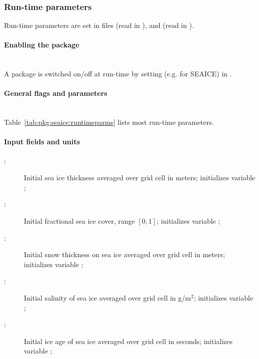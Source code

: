 
\subsubsection{Run-time parameters
\label{sec:pkg:seaice:runtime}}

Run-time parameters are set in files 
 (read in ),
and  (read in ).

\paragraph{Enabling the package}
~ \\
%
A package is switched on/off at run-time by setting
(e.g. for SEAICE)  in .

\paragraph{General flags and parameters}
~ \\
%
Table~\ref{tab:pkg:seaice:runtimeparms} lists most run-time parameters.


\paragraph{Input fields and units\label{sec:pkg:seaice:fields_units}}
\begin{description}
\item[:] Initial sea ice thickness averaged over grid cell
  in meters; initializes variable ;
\item[:] Initial fractional sea ice cover, range $[0,1]$;
  initializes variable ;
\item[:] Initial snow thickness on sea ice averaged
  over grid cell in meters; initializes variable ;
\item[:] Initial salinity of sea ice averaged over grid
  cell in g/m$^2$; initializes variable ;
\item[:] Initial ice age of sea ice averaged over grid
  cell in seconds; initializes variable ;
\end{description}

